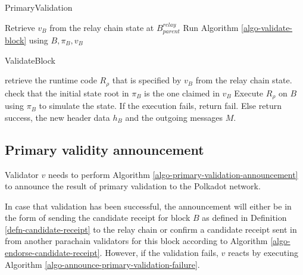 \begin{algorithm}[H]
  \caption[]{\sc PrimaryValidation}
  \label{algo-primary-validation}
  \begin{algorithmic}[1]

    \State Retrieve $v_B$ from the relay chain state at $B^{relay}_{parent}$
    \State Run Algorithm \ref{algo-validate-block} using $B, \pi_B, v_B$
  \end{algorithmic}
\end{algorithm}

\begin{algorithm}[H]
  \caption[]{\sc ValidateBlock}
  \label{algo-validate-block}
  \begin{algorithmic}[1]
    \State retrieve the runtime code $R_\rho$ that is specified by $v_B$ from the relay chain state.
    \State check that the initial state root in $\pi_B$ is the one claimed in $v_B$
    \State Execute $R_\rho$ on $B$ using $\pi_B$ to simulate the state.
    \State If the execution fails, return fail.
    \State Else return success, the new header data $h_B$ and the outgoing messages $M$. 
  \end{algorithmic}
\end{algorithm}

\subsection{Primary validity announcement}
\label{sect-primary-validaty-announcement}
Validator $v$ needs to perform Algorithm \ref{algo-primary-validation-announcement} to announce the result of primary validation to the Polkadot network.
\newline

In case that validation has been successful, the announcement will either be in
the form of sending the candidate receipt for block $B$ as defined in Definition
\ref{defn-candidate-receipt} to the relay chain or confirm a candidate receipt
sent in from another parachain validators for this block according to Algorithm
\ref{algo-endorse-candidate-receipt}. However, if the validation fails, $v$
reacts by executing Algorithm \ref{algo-announce-primary-validation-failure}.

